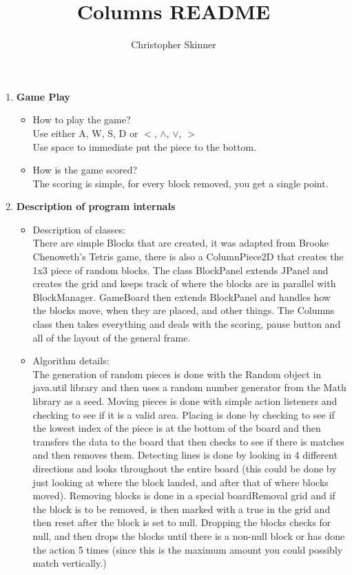 \documentclass{article}
\title{Columns README}
\author{Christopher Skinner}
\begin{document}
	\maketitle

\noindent\begin{enumerate}[leftmargin=1in]
\item\textbf{Game Play}
	\begin{itemize}
		\item How to play the game?\\
			Use either A, W, S, D or $<$, $\wedge$, $\vee$, $>$\\
			Use space to immediate put the piece to the bottom.
		\item How is the game scored?\\
			The scoring is simple, for every block removed, you get a single point.
			
	\end{itemize}

\item\textbf{Description of program internals}
	\begin{itemize}
		\item Description of classes:\\
		There are simple Blocks that are created, it was adapted from Brooke Chenoweth's Tetris game, there is also a ColumnPiece2D that creates the 1x3 piece of random blocks. The class BlockPanel extends JPanel and creates the grid and keeps track of where the blocks are in parallel with BlockManager. GameBoard then extends BlockPanel and handles how the blocks move, when they are placed, and other things. The Columns class then takes everything and deals with the scoring, pause button and all of the layout of the general frame.
		
		\item Algorithm details:\\
		The generation of random pieces is done with the Random object in java.util library and then uses a random number generator from the Math library as a seed. Moving pieces is done with simple action listeners and checking to see if it is a valid area. Placing is done by checking to see if the lowest index of the piece is at the bottom of the board and then transfers the data to the board that then checks to see if there is matches and then removes them. Detecting lines is done by looking in 4 different directions and looks throughout the entire board (this could be done by just looking at where the block landed, and after that of where blocks moved). Removing blocks is done in a special boardRemoval grid and if the block is to be removed, is then marked with a true in the grid and then reset after the block is set to null. Dropping the blocks checks for null, and then drops the blocks until there is a non-null block or has done the action 5 times (since this is the maximum amount you could possibly match vertically.)
		

\end{itemize}
\end{enumerate}
\end{document}
